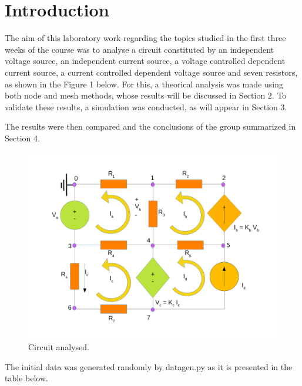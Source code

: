 \section{Introduction}
\label{introduction}

The aim of this laboratory work regarding the topics studied in the first three weeks of the course was to analyse a circuit constituted by an independent voltage source, an independent current source, a voltage controlled dependent current source, a current controlled dependent voltage source and seven resistors, as shown in the Figure 1 below.
 For this, a theorical analysis was made using both node and mesh methods, whose results will be discussed in Section 2. To validate these results, a simulation was conducted, as will appear in Section 3.


The results were then compared and the conclusions of the group summarized in Section 4.


\begin{figure}[ht] \centering
\includegraphics[width=0.9\linewidth]{t1draw.pdf}
\caption{Circuit analysed.}
\label{t1draw}
\end{figure}

The initial data was generated randomly by datagen.py as it is presented in the table below.

